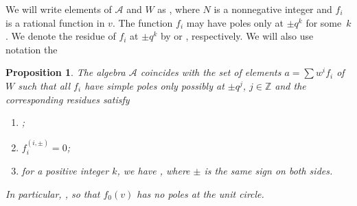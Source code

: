 \documentclass[pdftex]{sigma}
\newcommand{\mc}{\mathcal}
\newcommand{\ZN}{\mathbb{Z}}
\numberwithin{equation}{section}
\newtheorem{Proposition}[Theorem]{Proposition}
\theoremstyle{definition}
\begin{document}
We will write elements of $\mc{A}$ and $W$ as , where $N$ is a nonnegative integer and $f_i$ is a rational function in $v$. The function $f_i$ may have poles only at $\pm q^k$ for some~$k$. We denote the residue of $f_i$ at $\pm q^k$ by  or , respectively. We will also use notation the~
\begin{Proposition}
\label{PropAInsideW}
The algebra $\mc{A}$ coincides with the set of elements $a=\sum w^i f_i$ of $W$ such that all $f_i$ have simple poles only possibly at $\pm q^j$, $j\in\ZN$ and the corresponding residues  satisfy
\begin{enumerate}\itemsep=0pt
 \item[$(1)$]
 ;
 \item[$(2)$]
 $f_i^{(i,\pm)}=0$;
 \item[$(3)$]
 for a positive integer $k$, we have , where $\pm$ is the same sign on both sides.
\end{enumerate}
In particular, , so that $f_0(v)$ has no poles at the unit circle.
\end{Proposition}
\end{document}
